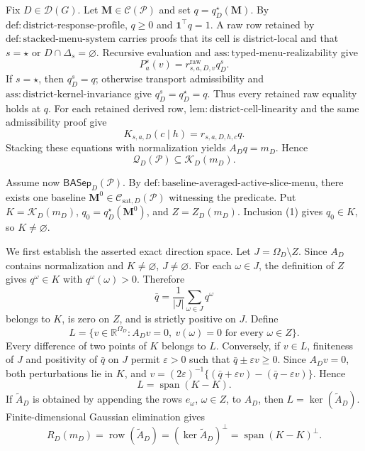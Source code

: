 Fix \(D\in\mathcal D(G)\).  Let \(\mathbf M\in\mathcal C(\mathcal P)\) and set \(q=q_D^\star(\mathbf M)\).  By \(\mathrm{def:district\text{-}response\text{-}profile}\), \(q\geq0\) and \(\mathbf 1^\top q=1\).  A raw row retained by \(\mathrm{def:stacked\text{-}menu\text{-}system}\) carries proofs that its cell is district-local and that \(s=\star\) or \(D\cap\Delta_s=\varnothing\).  Recursive evaluation and \(\mathrm{ass:typed\text{-}menu\text{-}realizability}\) give
\[
P_a^s(v)=r^{\mathrm{raw}}_{s,a,D,v}q_D^s.
\]
If \(s=\star\), then \(q_D^s=q\); otherwise transport admissibility and \(\mathrm{ass:district\text{-}kernel\text{-}invariance}\) give \(q_D^s=q_D^\star=q\).  Thus every retained raw equality holds at \(q\).  For each retained derived row, \(\mathrm{lem:district\text{-}cell\text{-}linearity}\) and the same admissibility proof give
\[
K_{s,a,D}(c\mid h)=r_{s,a,D,h,c}q.
\]
Stacking these equations with normalization yields \(A_Dq=m_D\).  Hence
\[
\mathcal Q_D(\mathcal P)\subseteq\mathcal K_D(m_D).
\tag{1}
\]

Assume now \(\mathsf{BASep}_D(\mathcal P)\).  By \(\mathrm{def:baseline\text{-}averaged\text{-}active\text{-}slice\text{-}menu}\), there exists one baseline \(\mathbf M^0\in\mathcal C_{\mathrm{sat},D}(\mathcal P)\) witnessing the predicate.  Put \(K=\mathcal K_D(m_D)\), \(q_0=q_D^\star(\mathbf M^0)\), and \(Z=Z_D(m_D)\).  Inclusion (1) gives \(q_0\in K\), so \(K\ne\varnothing\).

We first establish the asserted exact direction space.  Let \(J=\Omega_D\setminus Z\).  Since \(A_D\) contains normalization and \(K\ne\varnothing\), \(J\ne\varnothing\).  For each \(\omega\in J\), the definition of \(Z\) gives \(q^\omega\in K\) with \(q^\omega(\omega)>0\).  Therefore
\[
\bar q=\frac1{|J|}\sum_{\omega\in J}q^\omega
\]
belongs to \(K\), is zero on \(Z\), and is strictly positive on \(J\).  Define
\[
L=\{v\in\mathbb R^{\Omega_D}:A_Dv=0,
\ v(\omega)=0\text{ for every }\omega\in Z\}.
\]
Every difference of two points of \(K\) belongs to \(L\).  Conversely, if \(v\in L\), finiteness of \(J\) and positivity of \(\bar q\) on \(J\) permit \(\varepsilon>0\) such that \(\bar q\pm\varepsilon v\geq0\).  Since \(A_Dv=0\), both perturbations lie in \(K\), and
\(v=(2\varepsilon)^{-1}\{(\bar q+\varepsilon v)-(\bar q-\varepsilon v)\}\).  Hence
\[
L=\operatorname{span}(K-K).
\tag{2}
\]
If \(\widetilde A_D\) is obtained by appending the rows \(e_\omega\), \(\omega\in Z\), to \(A_D\), then \(L=\ker(\widetilde A_D)\).  Finite-dimensional Gaussian elimination gives
\[
R_D(m_D)=\operatorname{row}(\widetilde A_D)
=(\ker\widetilde A_D)^\perp
=\operatorname{span}(K-K)^\perp.
\tag{3}
\]

